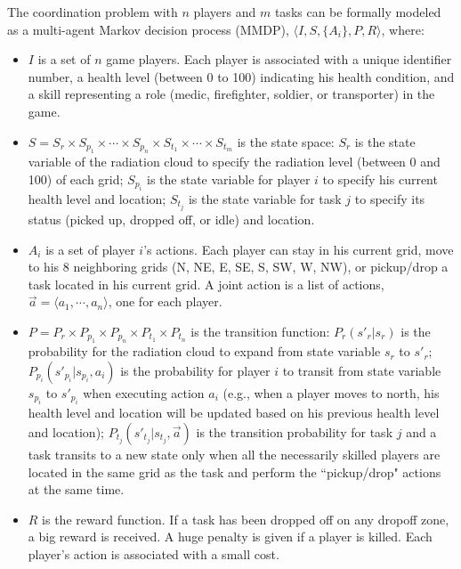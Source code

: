 \documentclass{aamas2014}
\begin{document}
The coordination problem with $n$ players and $m$ tasks can be
formally modeled as a multi-agent Markov decision process (MMDP),
$\langle I, S, \{A_i\}, P, R \rangle$, where:
\begin{itemize}
  \item $I$ is a set of $n$ game players. Each player is
      associated with a unique identifier number, a health
      level (between 0 to 100) indicating his health condition,
      and a skill representing a role (medic, firefighter,
      soldier, or transporter) in the game.
  \item $S = S_r \times S_{p_1} \times \cdots \times S_{p_n}
      \times S_{t_1} \times \cdots \times S_{t_m}$ is the state
      space: $S_r$ is the state variable of the radiation cloud
      to specify the radiation level (between 0 and 100) of
      each grid; $S_{p_i}$ is the state variable for player $i$
      to specify his current health level and location;
      $S_{t_j}$ is the state variable for task $j$ to specify
      its status (picked up, dropped off, or idle) and
      location.
  \item $A_i$ is a set of player $i$'s actions. Each player can
      stay in his current grid, move to his 8 neighboring grids
      (N, NE, E, SE, S, SW, W, NW), or pickup/drop a task
      located in his current grid. A joint action is a list of
      actions, $\vec{a}=\langle a_1, \cdots, a_n \rangle$, one
      for each player.
  \item $P = P_r \times P_{p_1} \times P_{p_n} \times P_{t_1}
      \times P_{t_n}$ is the transition function:
      $P_r(s'_r|s_r)$ is the probability for the radiation
      cloud to expand from state variable $s_r$ to $s'_r$;
      $P_{p_i}(s'_{p_i}|s_{p_i}, a_i)$ is the probability for
      player $i$ to transit from state variable $s_{p_i}$ to
      $s'_{p_i}$ when executing action $a_i$ (e.g., when a
      player moves to north, his health level and location will
      be updated based on his previous health level and
      location); $P_{t_j}(s'_{t_j}|s_{t_j}, \vec{a})$ is the
      transition probability for task $j$ and a task transits
      to a new state only when all the necessarily skilled
      players are located in the same grid as the task and
      perform the ``pickup/drop" actions at the same time.
  \item $R$ is the reward function. If a task has been dropped
      off on any dropoff zone, a big reward is received. A huge
      penalty is given if a player is killed. Each player's
      action is associated with a small cost.
\end{itemize}
\end{document}
